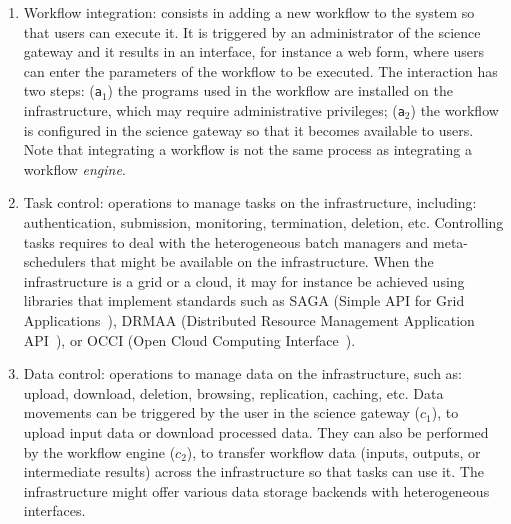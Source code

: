 \documentclass[preprint,3p,twocolumn]{elsarticle}
\newcommand{\closedanswerednote}[6]{}
\begin{document}
\begin{enumerate}[leftmargin=0cm,itemindent=0.65cm,label=\texttt{(\alph*)}]

\item Workflow integration: consists in adding a new workflow to the
  system so that users can execute it. It is triggered by an
  administrator of the science gateway and it results in an interface,
  for instance a web form, where users can enter the parameters of the
  workflow to be executed. The interaction has two steps:
  (\texttt{a$_1$}) the programs used in the workflow are installed on
  the infrastructure, which may require administrative privileges;
  (\texttt{a$_2$}) the workflow is configured in the science gateway
  so that it becomes available to users. Note that integrating a
  workflow is not the same process as integrating a workflow
  \emph{engine}.
\item Task control: operations to manage tasks on the infrastructure,
  including: authentication, submission, monitoring, termination,
  deletion, etc. Controlling tasks requires to deal with the
  heterogeneous batch managers and meta-schedulers that might be
  available on the infrastructure. When the infrastructure is a grid
  or a cloud, it may for instance be achieved using libraries that
  implement standards such as SAGA (Simple API for Grid
  Applications~\cite{goodale2006saga}), DRMAA (Distributed Resource
  Management Application API~\cite{troger2012distributed}), or OCCI
  (Open Cloud Computing Interface~\cite{edmonds2012toward}).
\item Data control: operations to manage data on the infrastructure,
  such as: upload, download, deletion, browsing, replication, caching,
  etc. Data movements can be triggered by the user in the science
  gateway (\texttt{$c_1$}), to upload input data or download processed
  data. They can also be performed by the workflow engine
  (\texttt{$c_2$}), to transfer workflow data (inputs, outputs, or
  intermediate results) across the infrastructure so that tasks can
  use it. The infrastructure might offer various data storage backends
  with heterogeneous interfaces. \closedanswerednote{Marc-Etienne}{this -c2- can be also trigerred
    by the user}{Tristan}{No, it can't: this is by definition an interaction between the workflow engine and the infrastructure. It is used to transfer data to/from tasks. I reworded a bit, is it clearer now?}
    {Marc-e}{I meant, "using c1", a user in some platforms (CBRAIN), can trigger
    some operations across the infrastructure, as in c2... not just up/download data.
}
\end{enumerate}
\end{document}
